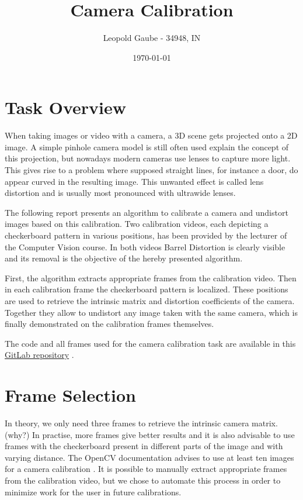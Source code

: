 \documentclass[bibliography=totoc]{scrartcl}
\title{Camera Calibration}
\author{Leopold Gaube - 34948, IN}
\date{\today}
\begin{document}
\maketitle
\tableofcontents

\clearpage

\section{Task Overview}

When taking images or video with a camera, a 3D scene gets projected onto a 2D image.
A simple pinhole camera model is still often used explain the concept of this projection, but nowadays modern cameras use lenses to capture more light.
This gives rise to a problem where supposed straight lines, for instance a door, do appear curved in the resulting image. 
This unwanted effect is called lens distortion and is usually most pronounced with ultrawide lenses.

The following report presents an algorithm to calibrate a camera and undistort images based on this calibration.
Two calibration videos, each depicting a checkerboard pattern in various positions, has been provided by the lecturer of the Computer Vision course.
In both videos Barrel Distortion is clearly visible and its removal is the objective of the hereby presented algorithm.

First, the algorithm extracts appropriate frames from the calibration video.
Then in each calibration frame the checkerboard pattern is localized.
These positions are used to retrieve the intrinsic matrix and distortion coefficients of the camera. 
Together they allow to undistort any image taken with the same camera, which is finally demonstrated on the calibration frames themselves.

The code and all frames used for the camera calibration task are available in this \href{https://gitlab.com/gaubeleo/camera-calibration}{GitLab repository} \cite{Gitlab}.

\section{Frame Selection}
In theory, we only need three frames to retrieve the intrinsic camera matrix. (why?)
In practise, more frames give better results and it is also advisable to use frames with the checkerboard present in different parts of the image and with varying distance.
The OpenCV documentation advises to use at least ten images for a camera calibration \cite{CameraCalibration}.
It is possible to manually extract appropriate frames from the calibration video, but we chose to automate this process in order to minimize work for the user in future calibrations. 
\end{document}
